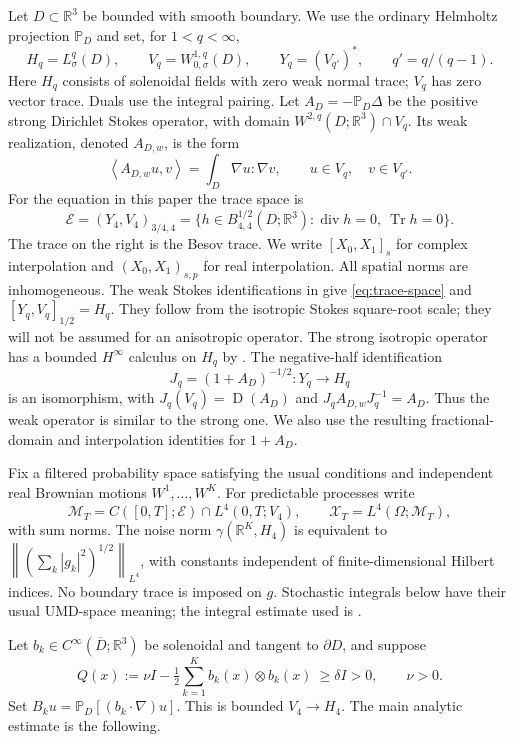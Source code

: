 \documentclass[11pt]{article}
\numberwithin{equation}{section}
\theoremstyle{remark}
\newcommand{\R}{\mathbb R}
\newcommand{\PP}{\mathbb P}
\newcommand{\Tr}{\operatorname{Tr}}
\newcommand{\divg}{\operatorname{div}}
\newcommand{\calE}{\mathcal E}
\newcommand{\calX}{\mathcal X}
\newcommand{\calM}{\mathcal M}
\newcommand{\norm}[1]{\left\lVert#1\right\rVert}
\newcommand{\ip}[2]{\left\langle#1,#2\right\rangle}
\DeclareMathOperator{\Dom}{D}
\begin{document}
Let $D\subset\R^3$ be bounded with smooth boundary. We use the ordinary
Helmholtz projection $\PP_D$ and set, for $1<q<\infty$,
\[
 H_q=L^q_\sigma(D),\qquad V_q=W^{1,q}_{0,\sigma}(D),
 \qquad Y_q=(V_{q'})^*,\qquad q'=q/(q-1).
\]
Here $H_q$ consists of solenoidal fields with zero weak normal trace;
$V_q$ has zero vector trace. Duals use the integral pairing. Let
$A_D=-\PP_D\Delta$ be the positive strong Dirichlet Stokes operator,
with domain $W^{2,q}(D;\R^3)\cap V_q$. Its weak realization, denoted
$A_{D,w}$, is the form
\begin{equation}\label{eq:weak-stokes}
 \ip{A_{D,w}u}{v}=\int_D\nabla u:\nabla v,
 \qquad u\in V_q,\quad v\in V_{q'}.
\end{equation}
For the equation in this paper the trace space is
\begin{equation}\label{eq:trace-space}
 \calE=(Y_4,V_4)_{3/4,4}
 =\{h\in B^{1/2}_{4,4}(D;\R^3):\divg h=0,\ \Tr h=0\}.
\end{equation}
The trace on the right is the Besov trace. We write $[X_0,X_1]_s$
for complex interpolation and $(X_0,X_1)_{s,p}$ for real interpolation.
All spatial norms are inhomogeneous. The weak Stokes identifications in
\cite[Section 5, Proposition 5.1]{PW} give \eqref{eq:trace-space} and
$[Y_q,V_q]_{1/2}=H_q$. They follow from the isotropic Stokes
square-root scale; they will not be assumed for an anisotropic operator.
The strong isotropic operator has a bounded $H^\infty$ calculus on
$H_q$ by \cite[Theorem 9.17]{KKW}. The negative-half identification
\[
 J_q=(1+A_D)^{-1/2}:Y_q\longrightarrow H_q
\]
is an isomorphism, with $J_q(V_q)=\Dom(A_D)$ and
$J_qA_{D,w}J_q^{-1}=A_D$. Thus the weak operator is similar to the
strong one. We also use the resulting fractional-domain and
interpolation identities for $1+A_D$.

Fix a filtered probability space satisfying the usual conditions and
independent real Brownian motions $W^1,\ldots,W^K$. For predictable
processes write
\[
 \calM_T=C([0,T];\calE)\cap L^4(0,T;V_4),\qquad
 \calX_T=L^4(\Omega;\calM_T),
\]
with sum norms. The noise norm $\gamma(\R^K,H_4)$ is equivalent to
$\norm{(\sum_k|g_k|^2)^{1/2}}_{L^4}$, with constants independent of
finite-dimensional Hilbert indices. No boundary trace is imposed on $g$.
Stochastic integrals below have their usual UMD-space meaning; the
integral estimate used is \cite[Proposition 2.4]{AV}.

Let $b_k\in C^\infty(\overline D;\R^3)$ be solenoidal and tangent to
$\partial D$, and suppose
\begin{equation}\label{eq:parabolicity}
 Q(x):=\nu I-\tfrac12\sum_{k=1}^K b_k(x)\otimes b_k(x)
 \ \geq\delta I>0,\qquad \nu>0.
\end{equation}
Set $B_ku=\PP_D[(b_k\cdot\nabla)u]$. This is bounded
$V_4\to H_4$. The main analytic estimate is the following.
\end{document}
